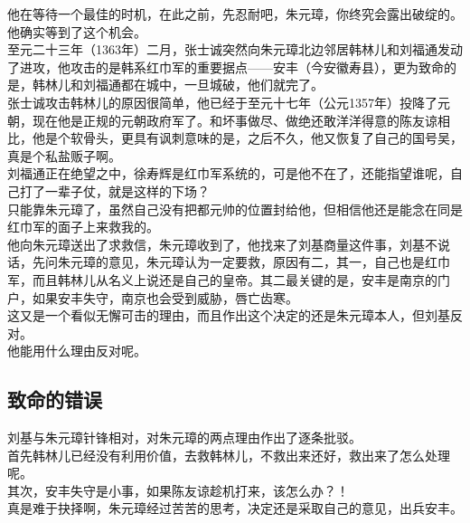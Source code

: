 \begin{multicols}{\theparacolNo}
他在等待一个最佳的时机，在此之前，先忍耐吧，朱元璋，你终究会露出破绽的。\\

他确实等到了这个机会。\\

至元二十三年（1363年）二月，张士诚突然向朱元璋北边邻居韩林儿和刘福通发动了进攻，他攻击的是韩系红巾军的重要据点——安丰（今安徽寿县），更为致命的是，韩林儿和刘福通都在城中，一旦城破，他们就完了。\\

张士诚攻击韩林儿的原因很简单，他已经于至元十七年（公元1357年）投降了元朝，现在他是正规的元朝政府军了。和坏事做尽、做绝还敢洋洋得意的陈友谅相比，他是个软骨头，更具有讽刺意味的是，之后不久，他又恢复了自己的国号吴，真是个私盐贩子啊。\\

刘福通正在绝望之中，徐寿辉是红巾军系统的，可是他不在了，还能指望谁呢，自己打了一辈子仗，就是这样的下场？\\

只能靠朱元璋了，虽然自己没有把都元帅的位置封给他，但相信他还是能念在同是红巾军的面子上来救我的。\\

他向朱元璋送出了求救信，朱元璋收到了，他找来了刘基商量这件事，刘基不说话，先问朱元璋的意见，朱元璋认为一定要救，原因有二，其一，自己也是红巾军，而且韩林儿从名义上说还是自己的皇帝。其二最关键的是，安丰是南京的门户，如果安丰失守，南京也会受到威胁，唇亡齿寒。\\

这又是一个看似无懈可击的理由，而且作出这个决定的还是朱元璋本人，但刘基反对。\\

他能用什么理由反对呢。\\

\subsection{致命的错误}
刘基与朱元璋针锋相对，对朱元璋的两点理由作出了逐条批驳。\\

首先韩林儿已经没有利用价值，去救韩林儿，不救出来还好，救出来了怎么处理呢。\\

其次，安丰失守是小事，如果陈友谅趁机打来，该怎么办？！\\

真是难于抉择啊，朱元璋经过苦苦的思考，决定还是采取自己的意见，出兵安丰。\\


\end{multicols}
